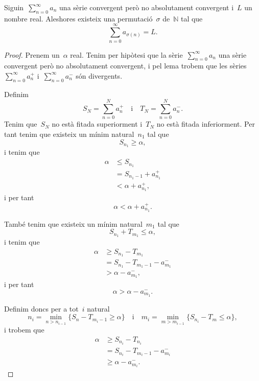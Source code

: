 \documentclass[../../main.tex]{subfiles}
\begin{document}
    \begin{theorem}
        \label{thm:Teorema de la reordenació de sèries de Riemann}
        Siguin~\(\sum_{n=0}^{\infty}a_{n}\) una sèrie convergent però no absolutament convergent i~\(L\) un nombre real.
        Aleshores existeix una permutació~\(\sigma\) de~\(\mathbb{N}\) tal que
        \[
            \sum_{n=0}^{\infty}a_{\sigma(n)}=L.
        \]
        \begin{proof}
            Prenem un~\(\alpha\) real.
            Tenim per hipòtesi que la sèrie~\(\sum_{n=0}^{\infty}a_{n}\) una sèrie convergent però no absolutament convergent, i pel lema  trobem que les sèries~\(\sum_{n=0}^{\infty}a^{+}_{n}\) i~\(\sum_{n=0}^{\infty}a^{-}_{n}\) són divergents.

            Definim
            \[
                S_{N}=\sum_{n=0}^{N}a^{+}_{n}\quad\text{i}\quad T_{N}=\sum_{n=0}^{N}a^{-}_{n}.
            \]
            Tenim que~\(S_{N}\) no està fitada superiorment i~\(T_{N}\) no està fitada inferiorment.
            Per tant tenim que existeix un mínim natural~\(n_{1}\) tal que
            \[
                S_{n_{1}}\geq\alpha,
            \]
            i tenim que
            \begin{align*}
                \alpha&\leq S_{n_{1}} \\
                &=S_{n_{1}-1}+a^{+}_{n_{1}} \\
                &<\alpha+a^{+}_{n_{1}},
            \end{align*}
            i per tant
            \[
                \alpha<\alpha+a^{+}_{n_{1}}.
            \]

            També tenim que existeix un mínim natural~\(m_{1}\) tal que
            \[
                S_{n_{1}}+T_{m_{1}}\leq\alpha,
            \]
            i tenim que
            \begin{align*}
                \alpha&\geq S_{n_{1}}-T_{m_{1}} \\
                &=S_{n_{1}}-T_{m_{1}-1}-a^{-}_{m_{1}} \\
                &>\alpha-a^{-}_{m_{1}},
            \end{align*}
            i per tant
            \[
                \alpha>\alpha-a^{-}_{m_{1}}.
            \]

            Definim doncs per a tot~\(i\) natural
            \[
                n_{i}=\min_{n>n_{i-1}}\{S_{n}-T_{m_{i}-1}\geq\alpha\}\quad\text{i}\quad m_{i}=\min_{m>m_{i-1}}\{S_{n_{i}}-T_{m}\leq\alpha\},
            \]
            i trobem que
            \begin{align*}
                \alpha&\geq S_{n_{i}}-T_{n_{i}} \\
                &=S_{n_{i}}-T_{m_{i}-1}-a^{-}_{m_{i}} \\
                &\geq\alpha-a^{-}_{m_{i}}.
            \end{align*}


\end{proof}
\end{theorem}
\end{document}
